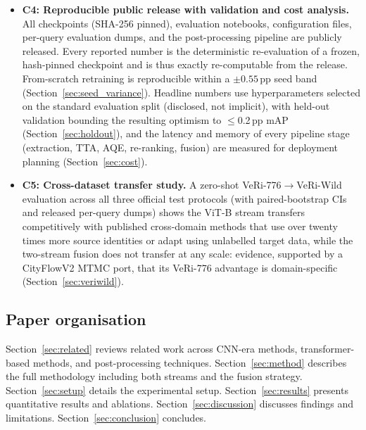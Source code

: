 \begin{itemize}
    ablation traces the complete performance trajectory from the 82.3\%
    TransReID baseline to 93.3\% mAP under a single consistent post-processing
    protocol, separating post-processing contributions from recipe
    contributions instead of conflating them.
  \item \textbf{C4: Reproducible public release with validation and cost
    analysis.} All checkpoints (SHA-256 pinned), evaluation notebooks,
    configuration files, per-query evaluation dumps, and the post-processing
    pipeline are publicly released. Every reported number is the deterministic
    re-evaluation of a frozen, hash-pinned checkpoint and is thus
    exactly re-computable from the release. From-scratch retraining is
    reproducible within a $\pm0.55$\,pp seed band
    (Section~\ref{sec:seed_variance}). Headline numbers use hyperparameters
    selected on the standard evaluation split (disclosed, not implicit), with
    held-out validation bounding the resulting optimism to $\leq$0.2\,pp mAP
    (Section~\ref{sec:holdout}), and the latency and memory of every pipeline
    stage (extraction, TTA, AQE, re-ranking, fusion) are measured for
    deployment planning (Section~\ref{sec:cost}).
  \item \textbf{C5: Cross-dataset transfer study.} A zero-shot
    VeRi-776$\rightarrow$VeRi-Wild evaluation across all three official test
    protocols (with paired-bootstrap CIs and released per-query dumps) shows
    the ViT-B stream transfers competitively with published cross-domain
    methods that use over twenty times more source identities or adapt using
    unlabelled target data, while the two-stream fusion does not
    transfer at any scale: evidence, supported by a CityFlowV2 MTMC port,
    that its VeRi-776 advantage is domain-specific
    (Section~\ref{sec:veriwild}).
\end{itemize}

\subsection{Paper organisation}
Section~\ref{sec:related} reviews related work across CNN-era methods,
transformer-based methods, and post-processing techniques.
Section~\ref{sec:method} describes the full methodology including both streams
and the fusion strategy. Section~\ref{sec:setup} details the experimental
setup. Section~\ref{sec:results} presents quantitative results and ablations.
Section~\ref{sec:discussion} discusses findings and limitations.
Section~\ref{sec:conclusion} concludes.
